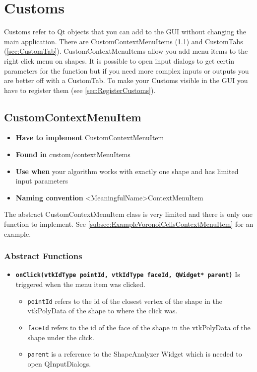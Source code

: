 
\chapter{Customs}
\label{chap:Customs}

Customs refer to Qt objects that you can add to the GUI without changing the main application. There are CustomContextMenuItems (\ref{sec:CustomContextMenuItem}) and CustomTabs (\ref{sec:CustomTab}). CustomContextMenuItems allow you add menu items to the right click menu on shapes. It is possible to open input dialogs to get certin parameters for the function but if you need more complex inputs or outputs you are better off with a CustomTab. To make your Customs visible in the GUI you have to register them (see \ref{sec:RegisterCustoms}).

\section{CustomContextMenuItem}
\label{sec:CustomContextMenuItem}

\begin{itemize}
	\item \textbf{Have to implement} CustomContextMenuItem
	\item \textbf{Found in} custom/contextMenuItems
	\item \textbf{Use when} your algorithm works with exactly one shape and has limited input parameters
	\item\textbf{Naming convention} <MeaningfulName>ContextMenuItem
\end{itemize}

The abstract CustomContextMenuItem class is very limited and there is only one function to implement. See \ref{subsec:ExampleVoronoiCellsContextMenuItem} for an example. 

\subsection{Abstract Functions}

\begin{itemize}
	\item \textbf{\texttt{onClick(vtkIdType pointId, vtkIdType faceId, QWidget* parent)}} Is triggered when the menu item was clicked. 
	\begin{itemize}
		\item \texttt{pointId} refers to the id of the closest vertex of the shape in the vtkPolyData of the shape to where the click was. 
		\item \texttt{faceId} refers to the id of the face of the shape in the vtkPolyData of the shape under the click. 
		\item \texttt{parent} is a reference to the ShapeAnalyzer Widget which is needed to open QInputDialogs.
	\end{itemize}
\end{itemize}

